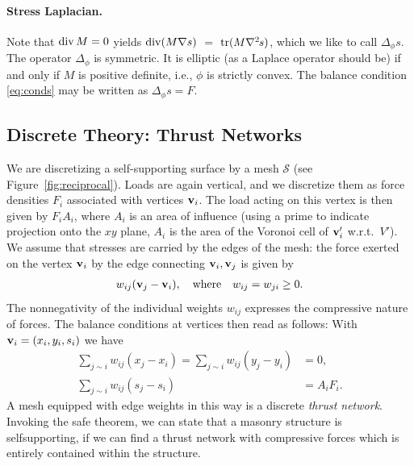 \documentclass[review]{acmsiggraph}
\def\Div{\mathop{{\rm div}}\nolimits}
\def\tr{\mathop{{\rm tr}}\nolimits}
\def\ess{s}
\def\Hess#1{{\def\testess{#1}\nabla^2\ifx\testess\ess\!s\else #1\fi}}
\def\Hess#1{\text{$\nabla^2\hskip-.2ex #1$}}
\def\SS{{\mathcal S}}
\begin{document}
\paragraph{Stress Laplacian.} Note that $\Div M =0$ yields $\Div(M\nabla 
s)$ $ =$ $ \tr(M\Hess s)$, which we like to call $\Delta_\phi s$. The 
operator $\Delta_\phi$ is symmetric. It is elliptic (as a Laplace operator 
should be) if and only if $M$ is positive definite, i.e., $\phi$ is 
strictly convex. The balance condition \eqref{eq:conds} may be written as
	$
	\Delta_\phi s = F.
	$


\subsection{Discrete Theory: Thrust Networks}
\label{sec:thrustnetworks}

We are discretizing a self-supporting surface by a mesh 
$\SS$ (see Figure~\ref{fig:reciprocal}). Loads are again vertical, 
and we discretize them as force densities $F_i$ associated with vertices 
${\mathbf v}_i$. The load acting on this vertex is then given by $F_iA_i$, where 
$A_i$ is an area of influence (using a prime to indicate projection onto 
the $xy$ plane, $A_i$ is the area of the Voronoi cell of ${\mathbf v}_i'$ w.r.t.\ 
$V'$). We assume that stresses are carried by the edges of the mesh: the 
force exerted on the vertex ${\mathbf v}_i$ by the edge connecting ${\mathbf v}_i,{\mathbf v}_j$ 
is given by
	\begin{align*}
	w_{ij} ({\mathbf v}_j-{\mathbf v}_i),
	\quad
	\text{where}\quad
	w_{ij}=w_{ji}\ge 0.
	\end{align*}
 The nonnegativity of the individual weights $w_{ij}$ expresses the 
compressive nature of forces. The balance conditions at vertices then read 
as follows: With ${\mathbf v}_i=(x_i,y_i,s_i)$ we have
	\begin{align}
	\sum\nolimits_{j\sim i}
		w_{ij} (x_j - x_i)
	=
	\sum\nolimits_{j\sim i}
		w_{ij} (y_j - y_i) &= 0,
			 \label{eq:deqtop} \\
	\sum\nolimits_{j\sim i}
		w_{ij} (s_j - s_i)
		&= A_i F_i.
			\label{eq:deqz}
	\end{align}
 A mesh equipped with edge weights in this way is a discrete \emph{thrust
network}. Invoking the safe theorem, we can state that a masonry structure
is self\dash supporting, if we can find a thrust network with compressive
forces which is entirely contained within the structure.
\end{document}
